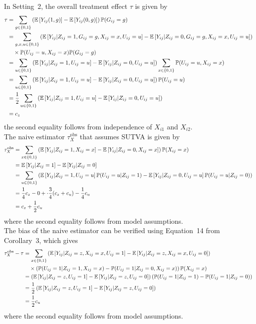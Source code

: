 \documentclass[10pt]{article}
\begin{document}
In Setting~2, the overall treatment effect $\tau$ is given by
\begin{align*}
\tau &= \sum_{g\in\{0,1\}} \left(\mathbb{E}\left[Y_{ij}(1,g)\right] - \mathbb{E}\left[Y_{ij}(0,g)\right]\right)\mathbb{P}(G_{ij}=g) \\
&= \sum_{g,x,u\in\{0,1\}} \left(\mathbb{E}\left[Y_{ij}|Z_{ij}=1,G_{ij}=g,X_{ij}=x,U_{ij}=u\right] - \mathbb{E}\left[Y_{ij}|Z_{ij}=0,G_{ij}=g,X_{ij}=x,U_{ij}=u\right]\right) \\
&\quad \times \mathbb{P}(U_{ij}=u,X_{ij}=x)\mathbb{P}(G_{ij}=g) \\
&= \sum_{u\in\{0,1\}} \left(\mathbb{E}\left[Y_{ij}|Z_{ij}=1,U_{ij}=u\right] - \mathbb{E}\left[Y_{ij}|Z_{ij}=0,U_{ij}=u\right]\right) \sum_{x\in\{0,1\}}\mathbb{P}(U_{ij}=u,X_{ij}=x) \\
&= \sum_{u\in\{0,1\}} \left(\mathbb{E}\left[Y_{ij}|Z_{ij}=1,U_{ij}=u\right] - \mathbb{E}\left[Y_{ij}|Z_{ij}=0,U_{ij}=u\right]\right)\mathbb{P}(U_{ij}=u) \\
&= \frac{1}{2}\sum_{u\in\{0,1\}} \left(\mathbb{E}\left[Y_{ij}|Z_{ij}=1,U_{ij}=u\right] - \mathbb{E}\left[Y_{ij}|Z_{ij}=0,U_{ij}=u\right]\right) \\
&= c_z
\end{align*}
the second equality follows from independence of $X_{i1}$ and $X_{i2}$.
\\

The naive estimator $\tau_{X}^\text{obs}$ that assumes SUTVA is given by
\begin{align*}
\tau_{X}^\text{obs} &= \sum_{x\in\{0,1\}}\left(\mathbb{E}\left[Y_{ij}|Z_{ij}=1,X_{ij}=x\right] - \mathbb{E}\left[Y_{ij}|Z_{ij}=0,X_{ij}=x\right]\right)\mathbb{P}(X_{ij}=x) \\
&= \mathbb{E}\left[Y_{ij}|Z_{ij}=1\right] - \mathbb{E}\left[Y_{ij}|Z_{ij}=0\right] \\
&= \sum_{u\in\{0,1\}}\left(\mathbb{E}\left[Y_{ij}|Z_{ij}=1,U_{ij}=u\right]\mathbb{P}(U_{ij}=u|Z_{ij}=1)  - \mathbb{E}\left[Y_{ij}|Z_{ij}=0,U_{ij}=u\right]\mathbb{P}(U_{ij}=u|Z_{ij}=0)\right) \\
&= \frac{1}{4}c_z - 0 + \cdot\frac{3}{4}(c_z+c_u) - \frac{1}{4}c_u \\
&= c_z + \frac{1}{2}c_u
\end{align*}
where the second equality follows from model assumptions.
\\

The bias of the naive estimator can be verified using Equation~14 from Corollary~3, which gives
\begin{align*}
\tau_{X}^\text{obs} - \tau &= \sum_{x\in\{0,1\}}\left(\mathbb{E}\left[Y_{ij}|Z_{ij}=z,X_{ij}=x,U_{ij}=1\right]-\mathbb{E}\left[Y_{ij}|Z_{ij}=z,X_{ij}=x,U_{ij}=0\right]\right) \\
&\quad \times\left(\mathbb{P}(U_{ij}=1|Z_{ij}=1,X_{ij}=x)-\mathbb{P}(U_{ij}=1|Z_{ij}=0,X_{ij}=x)\right)\mathbb{P}(X_{ij}=x) \\
&= \left(\mathbb{E}\left[Y_{ij}|Z_{ij}=z,U_{ij}=1\right]-\mathbb{E}\left[Y_{ij}|Z_{ij}=z,U_{ij}=0\right]\right)\left(\mathbb{P}(U_{ij}=1|Z_{ij}=1)-\mathbb{P}(U_{ij}=1|Z_{ij}=0)\right) \\
&= \frac{1}{2}\left(\mathbb{E}\left[Y_{ij}|Z_{ij}=z,U_{ij}=1\right]-\mathbb{E}\left[Y_{ij}|Z_{ij}=z,U_{ij}=0\right]\right) \\
&=\frac{1}{2}c_u
\end{align*}
where the second equality follows from model assumptions.
\end{document}

